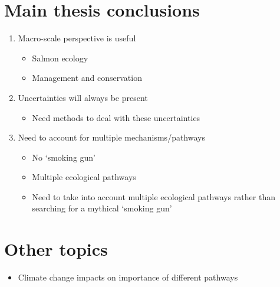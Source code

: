 \section{Main thesis conclusions}\label{main-thesis-conclusions}

\begin{enumerate}
\def\labelenumi{\arabic{enumi}.}
\tightlist
\item
  Macro-scale perspective is useful

  \begin{itemize}
  \tightlist
  \item
    Salmon ecology
  \item
    Management and conservation
  \end{itemize}
\item
  Uncertainties will always be present

  \begin{itemize}
  \tightlist
  \item
    Need methods to deal with these uncertainties
  \end{itemize}
\item
  Need to account for multiple mechanisms/pathways

  \begin{itemize}
  \tightlist
  \item
    No `smoking gun'
  \item
    Multiple ecological pathways
  \item
    Need to take into account multiple ecological pathways rather than
    searching for a mythical `smoking gun'
  \end{itemize}
\end{enumerate}

\section{Other topics}\label{other-topics}

\begin{itemize}
\tightlist
\item
  Climate change impacts on importance of different pathways
\end{itemize}
